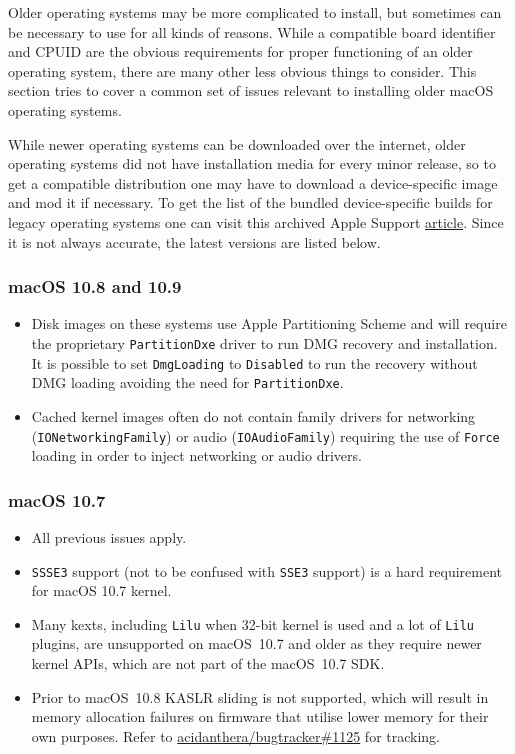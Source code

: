 \documentclass[]{article}
\begin{document}
Older operating systems may be more complicated to install, but sometimes can
be necessary to use for all kinds of reasons. While a compatible board identifier
and CPUID are the obvious requirements for proper functioning of an older
operating system, there are many other less obvious things to consider.
This section tries to cover a common set of issues relevant to installing
older macOS operating systems.

While newer operating systems can be downloaded over the internet,
older operating systems did not have installation media for every minor
release, so to get a compatible distribution one may have to download
a device-specific image and mod it if necessary. To get the list of
the bundled device-specific builds for legacy operating systems
one can visit this archived Apple Support
\href{https://web.archive.org/web/20170705003629/https://support.apple.com/en-us/HT204319}{article}.
Since it is not always accurate, the latest versions are listed below.

\subsubsection{macOS 10.8 and 10.9}\label{legacy108}

\begin{itemize}
  \item Disk images on these systems use Apple Partitioning Scheme
    and will require the proprietary \texttt{PartitionDxe} driver
    to run DMG recovery and installation. It is possible to set
    \texttt{DmgLoading} to \texttt{Disabled} to run the recovery
    without DMG loading avoiding the need for \texttt{PartitionDxe}.
  \item Cached kernel images often do not contain family drivers
    for networking (\texttt{IONetworkingFamily}) or audio
    (\texttt{IOAudioFamily}) requiring the use of \texttt{Force}
    loading in order to inject networking or audio drivers.
\end{itemize}

\subsubsection{macOS 10.7}\label{legacy107}

\begin{itemize}
  \item All previous issues apply.
  \item \texttt{SSSE3} support (not to be confused with \texttt{SSE3} support)
    is a hard requirement for macOS 10.7 kernel.
  \item Many kexts, including \texttt{Lilu} when 32-bit kernel
    is used and a lot of \texttt{Lilu} plugins, are
    unsupported on macOS~10.7 and older as they require newer
    kernel APIs, which are not part of the macOS~10.7 SDK.
  \item Prior to macOS~10.8 KASLR sliding is not supported, which
    will result in memory allocation failures on firmware
    that utilise lower memory for their own purposes. Refer to
    \href{https://github.com/acidanthera/bugtracker/issues/1125}{acidanthera/bugtracker\#1125}
    for tracking.
\end{itemize}
\end{document}
